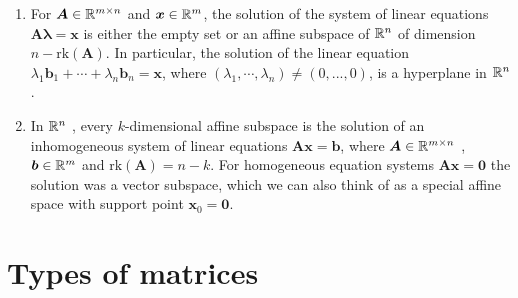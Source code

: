\begin{enumerate}
    \item For $\bm{A} \in \mathbb{R}^{m\times n}$ and $\bm{x} \in \mathbb{R}^m$, the solution of the system of linear equations $\bm{A} \bm{\lambda}  = \bm{x}$ is either the empty set or an affine subspace of $\mathbb{R}^n$ of dimension $n - \text{rk}(\bm{A})$.
    In particular, the solution of the linear equation $\lambda _1 \bm{b}_1 + \cdots + \lambda _n \bm{b}_n = \bm{x}$, where $(\lambda _1, \cdots , \lambda _n) \neq (0, . . . , 0)$, is a hyperplane in $\mathbb{R}^n$ .
    \hfill \cite{mfml/book/mml/Deisenroth-Faisal-Ong}

    \item In $\mathbb{R}^n$ , every $k$-dimensional affine subspace is the solution of an inhomogeneous system of linear equations $\bm{Ax} = \bm{b}$, where $\bm{A} \in \mathbb{R}^{m\times n}$ , $\bm{b} \in \mathbb{R}^m$ and $\text{rk}(\bm{A}) = n - k$.
    For homogeneous equation systems $\bm{Ax} = \bm{0}$ the solution was a vector subspace, which we can also think of as a special affine space with support point $\bm{x}_0 = \bm{0}$.
    \hfill \cite{mfml/book/mml/Deisenroth-Faisal-Ong}
\end{enumerate}

























\section{Types of matrices}
















